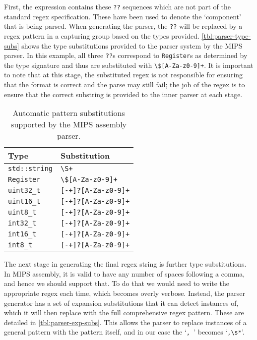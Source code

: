 First, the expression contains these \texttt{??} sequences which are not part of the standard regex specification. These have been used to denote the `component' that is being parsed. When generating the parser, the \texttt{??} will be replaced by a regex pattern in a capturing group based on the types provided. \autoref{tbl:parser-type-subs} shows the type substitutions provided to the parser system by the MIPS parser. In this example, all three \texttt{??}s correspond to \texttt{Register}s as determined by the type signature and thus are substituted with \texttt{\textbackslash \$[A-Za-z0-9]+}. It is important to note that at this stage, the substituted regex is not responsible for ensuring that the format is correct and the parse may still fail; the job of the regex is to ensure that the correct substring is provided to the inner parser at each stage.

\begin{table}[H] 
    \centering
    \begin{tabular}{l|l}
        \toprule
        Type & Substitution \\
        \midrule
        \texttt{std::string} & \texttt{\textbackslash S+} \\
        \texttt{Register} & \texttt{\textbackslash \$[A-Za-z0-9]+} \\
        \texttt{uint32\_t} & \texttt{[-+]?[A-Za-z0-9]+} \\
        \texttt{uint16\_t} & \texttt{[-+]?[A-Za-z0-9]+} \\
        \texttt{uint8\_t} & \texttt{[-+]?[A-Za-z0-9]+} \\
        \texttt{int32\_t} & \texttt{[-+]?[A-Za-z0-9]+} \\
        \texttt{int16\_t} & \texttt{[-+]?[A-Za-z0-9]+} \\
        \texttt{int8\_t} & \texttt{[-+]?[A-Za-z0-9]+} \\
        \bottomrule
    \end{tabular}
    \caption{Automatic pattern substitutions supported by the MIPS assembly parser.}
    \label{tbl:parser-type-subs}
\end{table}

The next stage in generating the final regex string is further type substitutions. In MIPS assembly, it is valid to have any number of spaces following a comma, and hence we should support that. To do that we would need to write the appropriate regex each time, which becomes overly verbose. Instead, the parser generator has a set of expansion substitutions that it can detect instances of, which it will then replace with the full comprehensive regex pattern. These are detailed in \autoref{tbl:parser-exp-subs}. This allows the parser to replace instances of a general pattern with the pattern itself, and in our case the `\texttt{, }' becomes `\texttt{,\textbackslash s*}'.

